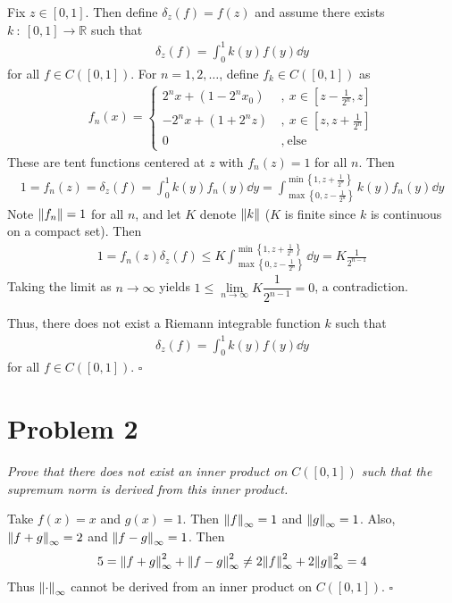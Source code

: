 \documentclass[12pt]{article}
\theoremstyle{plain}
\begin{document}
Fix $z \in [0, 1]$.  Then define $\delta_z(f) = f(z)$ and assume there exists $k\ :\ [0,1] \rightarrow \mathbb{R}$ such that
\begin{align*}
    \delta_z(f) = \int_0^1 k(y) f(y) \dd y
\end{align*}
for all $f \in C([0,1])$.  For $n = 1, 2, \dots$, define $f_k \in C([0,1])$ as
\begin{align*}
    f_n(x) = \left\{\begin{array}{ll}
        2^n x + (1 - 2^nx_0)\ &,\ x \in [z - \frac{1}{2^n}, z] \\
        -2^n x + (1 + 2^nz)\ &,\ x \in [z, z + \frac{1}{2^n}] \\
        0\ &,\ \text{else}
    \end{array}\right.
\end{align*}
These are tent functions centered at $z$ with $f_n(z) = 1$ for all $n$.  Then
\begin{align*}
    1 = f_n(z) = \delta_z(f) = \int_0^1 k(y) f_n(y) \dd y = \int_{\max\left\{{0, z - \frac{1}{2^n}}\right\}}^{\min\left\{{1, z + \frac{1}{2^n}}\right\}} k(y) f_n(y) \dd y
\end{align*}
Note $\norm{f_n} = 1$ for all $n$, and let $K$ denote $\norm{k}$ ($K$ is finite since $k$ is continuous on a compact set).  Then
\begin{align*}
    1 = f_n(z) \delta_z(f) \leq K\int_{\max\left\{{0, z - \frac{1}{2^n}}\right\}}^{\min\left\{{1, z + \frac{1}{2^n}}\right\}} \dd y = K\frac{1}{2^{n-1}}
\end{align*}
Taking the limit as $n \rightarrow \infty$ yields $1 \leq \lim\limits_{n\rightarrow \infty} K \dfrac{1}{2^{n-1}} = 0$, a contradiction. \medskip

Thus, there does not exist a Riemann integrable function $k$ such that
\begin{align*}
    \delta_z(f) = \int_0^1 k(y) f(y) \dd y
\end{align*}
for all $f \in C([0,1])$. \hfill $\square$

\section*{Problem 2}
\emph{Prove that there does not exist an inner product on $C([0,1])$ such that the supremum norm is derived from this inner product.} \medskip

Take $f(x) = x$ and $g(x) = 1$.  Then $\norm{f}_\infty = 1$ and $\norm{g}_\infty = 1$.  Also, $\norm{f + g}_\infty = 2$ and $\norm{f - g}_\infty = 1$.  Then
\begin{align*}
    5 = \norm{f + g}_\infty^2 + \norm{f - g}_\infty^2 \neq 2\norm{f}_\infty^2 + 2\norm{g}_\infty^2 = 4
\end{align*}
Thus $\norm{\cdot}_\infty$ cannot be derived from an inner product on $C([0,1])$. \hfill $\square$
\end{document}

